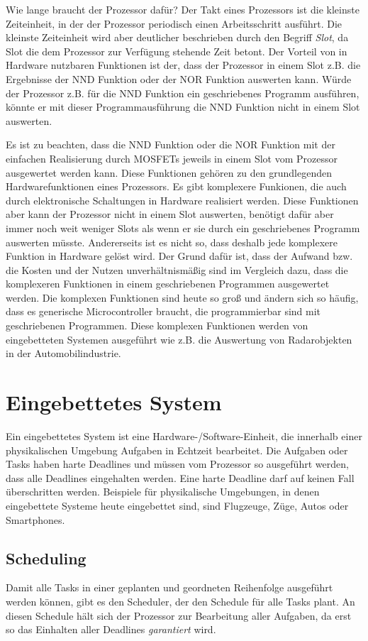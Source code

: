 \documentclass{scrarticle}
\numberwithin{equation}{section}
\begin{document}
Wie lange braucht der Prozessor dafür? Der Takt eines Prozessors ist die kleinste Zeiteinheit, in der der Prozessor periodisch einen Arbeitsschritt ausführt. Die kleinste Zeiteinheit wird aber deutlicher beschrieben durch den Begriff \textit{Slot}, da Slot die dem Prozessor zur Verfügung stehende Zeit betont. Der Vorteil von in Hardware nutzbaren Funktionen ist der, dass der Prozessor in einem Slot z.B. die Ergebnisse der NND Funktion oder der NOR Funktion auswerten kann. Würde der Prozessor z.B. für die NND Funktion ein geschriebenes Programm ausführen, könnte er mit dieser Programmausführung die NND Funktion nicht in einem Slot auswerten.

Es ist zu beachten, dass die NND Funktion oder die NOR Funktion mit der einfachen Realisierung durch MOSFETs jeweils in einem Slot vom Prozessor ausgewertet werden kann. Diese Funktionen gehören zu den grundlegenden Hardwarefunktionen eines Prozessors. Es gibt komplexere Funkionen, die auch durch elektronische Schaltungen in Hardware realisiert werden. Diese Funktionen aber kann der Prozessor nicht in einem Slot auswerten, benötigt dafür aber immer noch weit weniger Slots als wenn er sie durch ein geschriebenes Programm auswerten müsste. Andererseits ist es nicht so, dass deshalb jede komplexere Funktion in Hardware gelöst wird. Der Grund dafür ist, dass der Aufwand bzw. die Kosten und der Nutzen unverhältnismäßig sind im Vergleich dazu, dass die komplexeren Funktionen in einem geschriebenen Programmen ausgewertet werden. Die komplexen Funktionen sind heute so groß und ändern sich so häufig, dass es generische Microcontroller braucht, die programmierbar sind mit geschriebenen Programmen. Diese komplexen Funktionen werden von eingebetteten Systemen ausgeführt wie z.B. die Auswertung von Radarobjekten in der Automobilindustrie.

\section{Eingebettetes System}
Ein eingebettetes System ist eine Hardware-/Software-Einheit, die innerhalb einer physikalischen Umgebung Aufgaben in Echtzeit bearbeitet. Die Aufgaben oder Tasks haben harte Deadlines und müssen vom Prozessor so ausgeführt werden, dass alle Deadlines eingehalten werden. Eine harte Deadline darf auf keinen Fall überschritten werden. Beispiele für physikalische Umgebungen, in denen eingebettete Systeme heute eingebettet sind, sind Flugzeuge, Züge, Autos oder Smartphones.

\subsection{Scheduling}
Damit alle Tasks in einer geplanten und geordneten Reihenfolge ausgeführt werden können, gibt es den Scheduler, der den Schedule für alle Tasks plant. An diesen Schedule hält sich der Prozessor zur Bearbeitung aller Aufgaben, da erst so das Einhalten aller Deadlines \textit{garantiert} wird.
\end{document}
